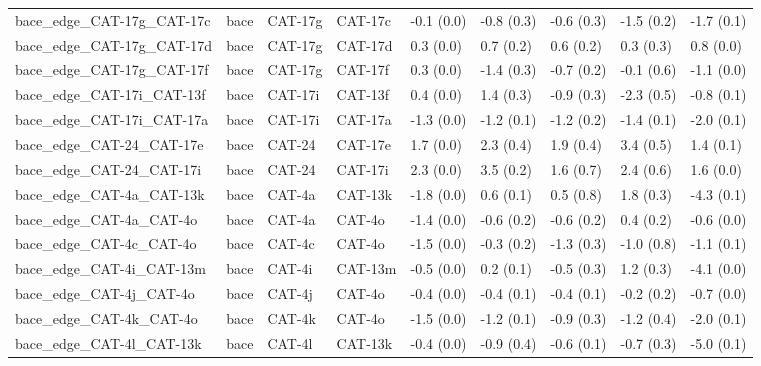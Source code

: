 \begin{tabular}{lllllllll}
bace\_edge\_CAT-17g\_CAT-17c        &      bace &     CAT-17g &     CAT-17c &  -0.1 (0.0) &        -0.8 (0.3) &  -0.6 (0.3) &  -1.5 (0.2) &  -1.7 (0.1) \\
bace\_edge\_CAT-17g\_CAT-17d        &      bace &     CAT-17g &     CAT-17d &   0.3 (0.0) &         0.7 (0.2) &   0.6 (0.2) &   0.3 (0.3) &   0.8 (0.0) \\
bace\_edge\_CAT-17g\_CAT-17f        &      bace &     CAT-17g &     CAT-17f &   0.3 (0.0) &        -1.4 (0.3) &  -0.7 (0.2) &  -0.1 (0.6) &  -1.1 (0.0) \\
bace\_edge\_CAT-17i\_CAT-13f        &      bace &     CAT-17i &     CAT-13f &   0.4 (0.0) &         1.4 (0.3) &  -0.9 (0.3) &  -2.3 (0.5) &  -0.8 (0.1) \\
bace\_edge\_CAT-17i\_CAT-17a        &      bace &     CAT-17i &     CAT-17a &  -1.3 (0.0) &        -1.2 (0.1) &  -1.2 (0.2) &  -1.4 (0.1) &  -2.0 (0.1) \\
bace\_edge\_CAT-24\_CAT-17e         &      bace &      CAT-24 &     CAT-17e &   1.7 (0.0) &         2.3 (0.4) &   1.9 (0.4) &   3.4 (0.5) &   1.4 (0.1) \\
bace\_edge\_CAT-24\_CAT-17i         &      bace &      CAT-24 &     CAT-17i &   2.3 (0.0) &         3.5 (0.2) &   1.6 (0.7) &   2.4 (0.6) &   1.6 (0.0) \\
bace\_edge\_CAT-4a\_CAT-13k         &      bace &      CAT-4a &     CAT-13k &  -1.8 (0.0) &         0.6 (0.1) &   0.5 (0.8) &   1.8 (0.3) &  -4.3 (0.1) \\
bace\_edge\_CAT-4a\_CAT-4o          &      bace &      CAT-4a &      CAT-4o &  -1.4 (0.0) &        -0.6 (0.2) &  -0.6 (0.2) &   0.4 (0.2) &  -0.6 (0.0) \\
bace\_edge\_CAT-4c\_CAT-4o          &      bace &      CAT-4c &      CAT-4o &  -1.5 (0.0) &        -0.3 (0.2) &  -1.3 (0.3) &  -1.0 (0.8) &  -1.1 (0.1) \\
bace\_edge\_CAT-4i\_CAT-13m         &      bace &      CAT-4i &     CAT-13m &  -0.5 (0.0) &         0.2 (0.1) &  -0.5 (0.3) &   1.2 (0.3) &  -4.1 (0.0) \\
bace\_edge\_CAT-4j\_CAT-4o          &      bace &      CAT-4j &      CAT-4o &  -0.4 (0.0) &        -0.4 (0.1) &  -0.4 (0.1) &  -0.2 (0.2) &  -0.7 (0.0) \\
bace\_edge\_CAT-4k\_CAT-4o          &      bace &      CAT-4k &      CAT-4o &  -1.5 (0.0) &        -1.2 (0.1) &  -0.9 (0.3) &  -1.2 (0.4) &  -2.0 (0.1) \\
bace\_edge\_CAT-4l\_CAT-13k         &      bace &      CAT-4l &     CAT-13k &  -0.4 (0.0) &        -0.9 (0.4) &  -0.6 (0.1) &  -0.7 (0.3) &  -5.0 (0.1) \\

\end{tabular}
